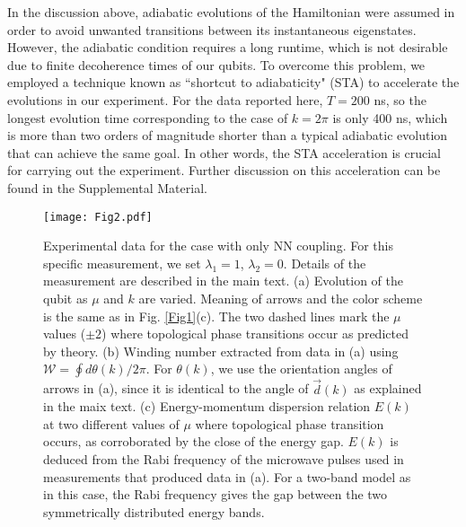 \documentclass[aps,reprint,groupedaddress,showpacs,superscriptaddress]{revtex4-1}
\begin{document}
In the discussion above, adiabatic evolutions of the Hamiltonian were assumed in order to avoid unwanted transitions between its instantaneous eigenstates. However, the adiabatic condition requires a long runtime, which is not desirable due to finite decoherence times of our qubits. To overcome this problem, we employed a technique known as ``shortcut to adiabaticity" (STA) \cite{Chen2010} to accelerate the evolutions in our experiment. For the data reported here, $T=200$ ns, so the longest evolution time corresponding to the case of $k=2\pi$ is only 400 ns, which is more than two orders of magnitude shorter than a typical adiabatic evolution that can achieve the same goal. In other words, the STA acceleration is crucial for carrying out the experiment. Further discussion on this acceleration can be found in the Supplemental Material.   

\begin{figure}[!htbp]
	\centering
	\texttt{[image: Fig2.pdf]}
	\caption{Experimental data for the case with only NN coupling. For this specific measurement, we set $\lambda_{1} = 1$, $\lambda_{2} = 0$. Details of the measurement are described in the main text. (a) Evolution of the qubit as $\mu$ and $k$ are varied. Meaning of arrows and the color scheme is the same as in Fig. \ref{Fig1}(c). The two dashed lines mark the $\mu$ values ($\pm2$) where topological phase transitions occur as predicted by theory. (b) Winding number extracted from data in (a) using $\mathcal{W}= \oint d \theta(k)/2\pi$. For $\theta(k)$, we use the orientation angles of arrows in (a), since it is identical to the angle of $\vec{d}(k)$ as explained in the maix text. (c) Energy-momentum dispersion relation $E(k)$ at two different values of $\mu$ where topological phase transition occurs, as corroborated by the close of the energy gap. $E(k)$ is deduced from the Rabi frequency of the microwave pulses used in measurements that produced data in (a). For a two-band model as in this case, the Rabi frequency gives the gap between the two symmetrically distributed energy bands.} \label{Fig2}
\end{figure} 
\end{document}
